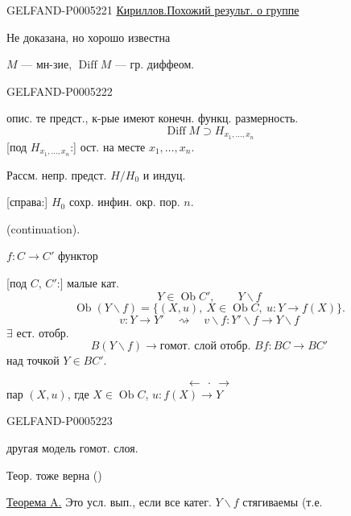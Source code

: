\begin{GelfandAdjacentEvidence}{GELFAND-P000522}{1}
\uline{Кириллов.}\qquad \uline{Похожий результ. о группе}

Не доказана, но хорошо известна

$M$ — мн-зие, $\operatorname{Diff}M$ — гр. диффеом.
\end{GelfandAdjacentEvidence}
\begin{GelfandAdjacentEvidence}{GELFAND-P000522}{2}


опис. те предст., к-рые имеют конечн. функц. размерность.
\[
\operatorname{Diff}M\supset H_{x_1,\ldots,x_n}
\]
[под $H_{x_1,\ldots,x_n}$:] ост. на месте $x_1,\ldots,x_n$.

Рассм. непр. предст. $H/H_0$ и индуц.

[справа:] $H_0$ сохр. инфин. окр. пор. $n$.

 (continuation).

$f:C\longrightarrow C'$ функтор

[под $C$, $C'$:] малые кат.
\[
Y\in\operatorname{Ob}C',\qquad Y\backslash f
\]
\[
\operatorname{Ob}(Y\backslash f)=
\{(X,u),\ X\in\operatorname{Ob}C,\ u:Y\longrightarrow f(X)\}.
\]
\[
v:Y\longrightarrow Y'\quad\rightsquigarrow\quad
v\backslash f:Y'\backslash f\longrightarrow Y\backslash f
\]
$\exists$ ест. отобр.
\[
B(Y\backslash f)\longrightarrow
\text{гомот. слой отобр. }Bf:BC\longrightarrow BC'
\]
над точкой $Y\in BC'$.

\[
\longleftarrow\ \cdot\ \longrightarrow
\]
 пар $(X,u)$, где $X\in\operatorname{Ob}C$,
$u:f(X)\longrightarrow Y$
\end{GelfandAdjacentEvidence}
\begin{GelfandAdjacentEvidence}{GELFAND-P000522}{3}

другая модель гомот. слоя.

Теор. тоже верна ()

\uline{Теорема A.} Это усл. вып., если все катег. $Y\backslash f$ стягиваемы
(т.е.
\end{GelfandAdjacentEvidence}
